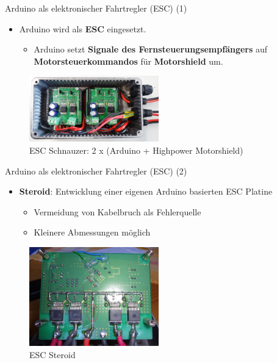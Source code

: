 \documentclass{beamer}
\begin{document}
\begin{frame}{Arduino als elektronischer Fahrtregler (ESC) (1)}
\begin{itemize}
	\item Arduino wird als \textbf{ESC} eingesetzt.
	\begin{itemize}
		\item Arduino setzt \textbf{Signale des Fernsteuerungsempf\"angers} auf \textbf{Motorsteuerkommandos} f\"ur \textbf{Motorshield} um.
	\end{itemize}
\end{itemize}
 \begin{figure}[H]
 	\centering
 	\includegraphics[width=0.5\textwidth]{./images/arduino-schnauzer.jpg}
 	\caption{ESC Schnauzer: 2 x (Arduino + Highpower Motorshield)}
 \end{figure}
\end{frame}
\begin{frame}{Arduino als elektronischer Fahrtregler (ESC) (2)}
\begin{itemize}
	\item \textbf{Steroid}: Entwicklung einer eigenen Arduino basierten ESC Platine
	\begin{itemize}
		\item Vermeidung von Kabelbruch als Fehlerquelle
		\item Kleinere Abmessungen m\"oglich
	\end{itemize}
\end{itemize}
\begin{figure}[H]
 	\centering
 	\includegraphics[width=0.5\textwidth]{./images/arduino-steroid.jpg}
 	\caption{ESC Steroid}
\end{figure}
\end{frame}
\end{document}
